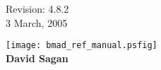 \thispagestyle{empty}

\begin{flushright}
\large
  Revision: 4.8.2 \\
  3 March, 2005 \\
\end{flushright}

\vfill

{
\begin{center}
\texttt{[image: bmad\_ref\_manual.psfig]} \\
\vskip 0.3in
\huge\bf David Sagan
\end{center}
}

\vfill
\break